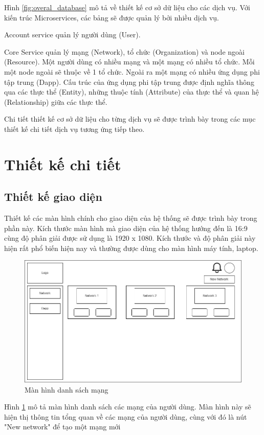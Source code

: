 \documentclass[../DoAn.tex]{subfiles}
\begin{document}
Hình \ref{fig:overal_database} mô tả về thiết kế cơ sở dữ liệu cho các dịch vụ.
Với kiến trúc Microservices, các bảng sẽ được quản lý bởi nhiều dịch vụ.

Account service quản lý người dùng (User).

Core Service quản lý mạng (Network), tổ chức (Organization) và node ngoài
(Resource). Một người dùng có nhiều mạng và một mạng có nhiều tổ chức. Mỗi một
node ngoài sẽ thuộc về 1 tổ chức. Ngoài ra một mạng có nhiều ứng dụng phi tập
trung (Dapp). Cấu trúc của ứng dụng phi tập trung được định nghĩa thông qua các
thực thể (Entity), những thuộc tính (Attribute) của thực thể và quan hệ
(Relationship) giữa các thực thể.

Chi tiết thiết kế cơ sở dữ liệu cho từng dịch vụ sẽ được trình bày trong các
mục thiết kế chi tiết dịch vụ tương ứng tiếp theo.

\section{Thiết kế chi tiết}

\subsection{Thiết kế giao diện}

Thiết kế các màn hình chính cho giao diện của hệ thống sẽ được trình bày trong
phần này. Kích thước màn hình mà giao diện của hệ thống hướng đến là 16:9 cùng
độ phân giải được sử dụng là 1920 x 1080. Kích thước và độ phân giải này hiện
rất phổ biến hiện nay và thường được dùng cho màn hình máy tính, laptop.

\begin{figure}[H]
    \centering
    \includegraphics[width=0.75\linewidth]{Hinhve/DoAn-ScreenNetworks.drawio.png}
    \caption{Màn hình danh sách mạng}
    \label{fig:screenNetworks}
\end{figure}

Hình \ref{fig:screenNetworks} mô tả màn hình danh sách các mạng của người dùng.
Màn hình này sẽ hiện thị thông tin tổng quan về các mạng của người dùng, cùng
với đó là nút "New network" để tạo một mạng mới
\end{document}
